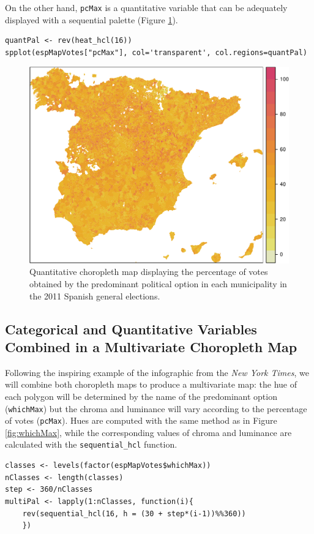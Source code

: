 \documentclass[smallroyalvopaper]{memoir}
\begin{document}
On the other hand, \texttt{pcMax} is a quantitative variable that can be
adequately displayed with a sequential palette (Figure \ref{fig:pcMax}).
\lstset{language=R,numbers=none}
\begin{lstlisting}
quantPal <- rev(heat_hcl(16))
spplot(espMapVotes["pcMax"], col='transparent', col.regions=quantPal)
\end{lstlisting}

\begin{figure}[htb]
\centering
\includegraphics[width=.9\linewidth]{figs/pcMax.pdf}
\caption{\label{fig:pcMax}Quantitative choropleth map displaying the percentage of votes obtained by the predominant political option in each municipality in the 2011 Spanish general elections.}
\end{figure}
\subsection{\floweroneleft Categorical and Quantitative Variables Combined in a Multivariate Choropleth Map}
\label{sec-1-3}
Following the inspiring example of the infographic from the \emph{New
York Times}, we will combine both choropleth maps to produce a
multivariate map: the hue of each polygon will be determined by
the name of the predominant option (\texttt{whichMax}) but the chroma and
luminance will vary according to the percentage of votes
(\texttt{pcMax}). Hues are computed with the same method as in Figure
\ref{fig:whichMax}, while the corresponding values of chroma and
luminance are calculated with the \texttt{sequential\_hcl} function.

\lstset{language=R,numbers=none}
\begin{lstlisting}
classes <- levels(factor(espMapVotes$whichMax))
nClasses <- length(classes)
step <- 360/nClasses
multiPal <- lapply(1:nClasses, function(i){
    rev(sequential_hcl(16, h = (30 + step*(i-1))%%360))
    })
\end{lstlisting}
\end{document}

